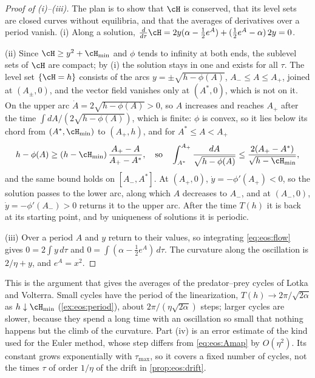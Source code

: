\begin{refsection}
\begin{proof}[Proof of (i)--(iii)]
The plan is to show that $\cH$ is conserved, that its level sets are closed curves without equilibria, and that the averages of derivatives over a period vanish. (i) Along a solution, $\frac{d}{d\tau}\cH=2y(\alpha-\frac12e^A)+(\frac12e^A-\alpha)\,2y=0$.

(ii) Since $\cH\ge y^2+\eosHmin$ and $\phi$ tends to infinity at both ends, the sublevel sets of $\cH$ are compact; by (i) the solution stays in one and exists for all $\tau$. The level set $\{\cH=h\}$ consists of the arcs $y=\pm\sqrt{h-\phi(A)}$, $A_-\le A\le A_+$, joined at $(A_\pm,0)$, and the vector field vanishes only at $(A^*,0)$, which is not on it. On the upper arc $\dot A=2\sqrt{h-\phi(A)}>0$, so $A$ increases and reaches $A_+$ after the time $\int dA/(2\sqrt{h-\phi(A)})$, which is finite: $\phi$ is convex, so it lies below its chord from $(A^*,\eosHmin)$ to $(A_+,h)$, and for $A^*\le A<A_+$
\[
  h-\phi(A)\ge(h-\eosHmin)\,\frac{A_+-A}{A_+-A^*},\quad\text{so}\quad\int_{A^*}^{A_+}\frac{dA}{\sqrt{h-\phi(A)}}\le\frac{2(A_+-A^*)}{\sqrt{h-\eosHmin}},
\]
and the same bound holds on $[A_-,A^*]$. At $(A_+,0)$, $\dot y=-\phi'(A_+)<0$, so the solution passes to the lower arc, along which $A$ decreases to $A_-$, and at $(A_-,0)$, $\dot y=-\phi'(A_-)>0$ returns it to the upper arc. After the time $T(h)$ it is back at its starting point, and by uniqueness of solutions it is periodic.

(iii) Over a period $A$ and $y$ return to their values, so integrating \eqref{eq:eos:flow} gives $0=2\int y\,d\tau$ and $0=\int(\alpha-\frac12e^A)\,d\tau$. The curvature along the oscillation is $2/\eta+y$, and $e^A=x^2$.
\end{proof}

This is the argument that gives the averages of the predator--prey cycles of Lotka and Volterra. Small cycles have the period of the linearization, $T(h)\to2\pi/\sqrt{2\alpha}$ as $h\downarrow\eosHmin$ (\cref{ex:eos:period}), about $2\pi/(\eta\sqrt{2\alpha})$ steps; larger cycles are slower, because they spend a long time with an oscillation so small that nothing happens but the climb of the curvature. Part (iv) is an error estimate of the kind used for the Euler method, whose step differs from \eqref{eq:eos:Amap} by $O(\eta^2)$. Its constant grows exponentially with $\tau_{\max}$, so it covers a fixed number of cycles, not the times $\tau$ of order $1/\eta$ of the drift in \cref{prop:eos:drift}.


\end{refsection}
